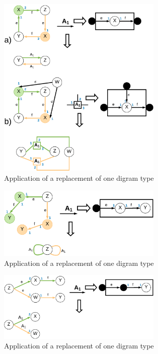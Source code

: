 \documentclass[a4paper]{scrartcl}
\begin{document}
\begin{figure}[h]
	\centering
	\includegraphics[width=0.7\textwidth]{img/type2}
	\caption{Application of a replacement of one digram type}
	\label{fig:type2}
\end{figure}

\begin{figure}[h]
	\centering
	\includegraphics[width=0.7\textwidth]{img/type3}
	\caption{Application of a replacement of one digram type}
	\label{fig:type3}
\end{figure}

\begin{figure}[h]
	\centering
	\includegraphics[width=0.7\textwidth]{img/type4}
	\caption{Application of a replacement of one digram type}
	\label{fig:type4}
\end{figure}
\end{document}

